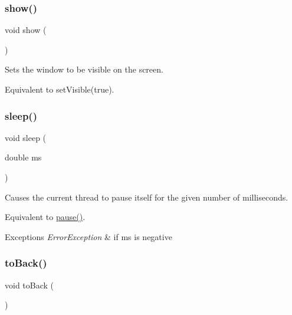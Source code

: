 \mbox{\label{classGWindow_a4b148f40a95444d5669406b918ad2f52}} 
\subsubsection{\texorpdfstring{show()}{show()}}
{\footnotesize\ttfamily void show (\begin{DoxyParamCaption}{ }\end{DoxyParamCaption})\hspace{0.3cm}{\ttfamily [virtual]}}



Sets the window to be visible on the screen. 

Equivalent to set\+Visible(true). \mbox{\label{classGWindow_aa3381590c1ef33c08000c2fbb2bf0dd0}} 
\subsubsection{\texorpdfstring{sleep()}{sleep()}}
{\footnotesize\ttfamily void sleep (\begin{DoxyParamCaption}\item[{double}]{ms }\end{DoxyParamCaption})\hspace{0.3cm}{\ttfamily [virtual]}}



Causes the current thread to pause itself for the given number of milliseconds. 

Equivalent to \mbox{\hyperlink{classGWindow_adc7d99bb2dc43b8337e89b7d54cab9d3}{pause()}}. 
\begin{DoxyExceptions}{Exceptions}
{\em Error\+Exception} & if ms is negative \\
\hline
\end{DoxyExceptions}
\mbox{\label{classGWindow_a6053c984b166df7d3db5ee4c4ad65b99}} 
\subsubsection{\texorpdfstring{to\+Back()}{toBack()}}
{\footnotesize\ttfamily void to\+Back (\begin{DoxyParamCaption}{ }\end{DoxyParamCaption})\hspace{0.3cm}{\ttfamily [virtual]}}



